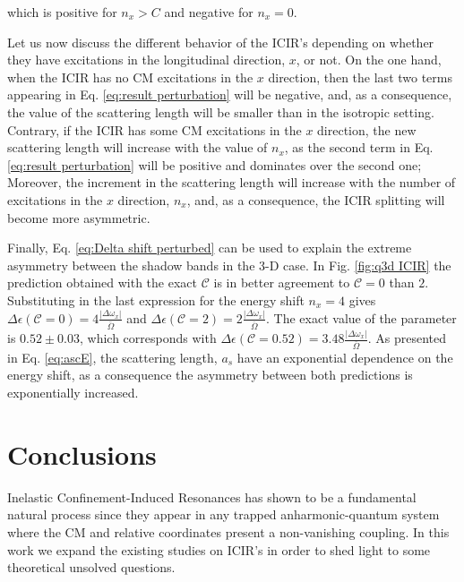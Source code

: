 \documentclass[aps,pre,twocolumn,superscriptaddress,showpacs]{revtex4-1}
\begin{document}
which is positive for $n_x > C$ and negative for $n_x=0$. 

Let us now discuss the different behavior of the ICIR's depending on whether they have excitations in the longitudinal direction, $x$, or not. On the one hand, when the ICIR has no CM excitations in the $x$ direction, then the last two terms appearing in Eq. \ref{eq:result perturbation} will be negative, and, as a consequence, the value of the scattering length will be smaller than in the isotropic setting. Contrary, if the ICIR has some CM excitations in the $x$ direction, the new scattering length will increase with the value of $n_x$, as the second term in Eq. \ref{eq:result perturbation} will be positive and dominates over the second one; Moreover, the increment in the scattering length will increase with the number of excitations in the $x$ direction, $n_x$, and, as a consequence, the ICIR splitting will become more asymmetric.

Finally, Eq. \ref{eq:Delta shift perturbed} can be used to explain the extreme asymmetry between the shadow bands in the 3-D case. In Fig. \ref{fig:q3d ICIR} the prediction obtained with the exact $\mathcal{C}$ is in better agreement to $\mathcal{C}=0$ than $2$. Substituting in the last expression for the energy shift $n_x = 4$ gives $\Delta \epsilon(\mathcal{C}=0) = 4\frac{|\Delta \omega_x|}{\bar{\Omega}}$ and $\Delta \epsilon(\mathcal{C}=2) = 2\frac{|\Delta \omega_x|}{\bar{\Omega}}$. The exact value of the parameter is $0.52 \pm 0.03$, which corresponds with $\Delta \epsilon(\mathcal{C}=0.52) = 3.48\frac{|\Delta \omega_x|}{\bar{\Omega}}$. As presented in Eq. \eqref{eq:ascE}, the scattering length, $a_s$ have an exponential dependence on the energy shift, as a consequence the asymmetry between both predictions is exponentially increased.

\section{Conclusions} \label{sec:conclusions}
Inelastic Confinement-Induced Resonances has shown to be a fundamental natural process since they appear in any trapped anharmonic-quantum system where the CM and relative coordinates present a non-vanishing coupling. In this work we expand the existing studies on ICIR's in order to shed light to some theoretical unsolved questions. 
\end{document}

